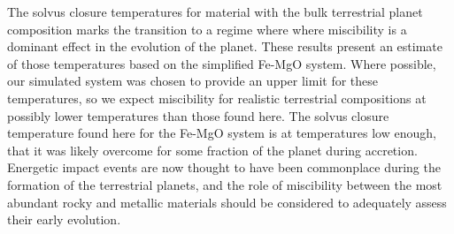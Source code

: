 The solvus closure temperatures for material with the bulk terrestrial planet composition
marks the transition to a regime where where miscibility is a dominant effect in the
evolution of the planet. These results present an estimate of those temperatures based on
the simplified Fe-MgO system. Where possible, our simulated system was chosen to provide
an upper limit for these temperatures, so we expect miscibility for realistic terrestrial
compositions at possibly lower temperatures than those found here. The solvus closure
temperature found here for the Fe-MgO system is at temperatures low enough, that it was
likely overcome for some fraction of the planet during accretion. Energetic impact events
are now thought to have been commonplace during the formation of the terrestrial planets,
and the role of miscibility between the most abundant rocky and metallic materials should
be considered to adequately assess their early evolution.



